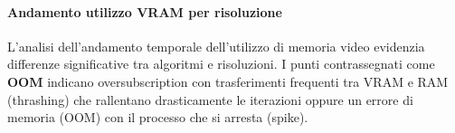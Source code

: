\paragraph{Andamento utilizzo VRAM per risoluzione}
L’analisi dell’andamento temporale dell’utilizzo di memoria video evidenzia differenze significative tra algoritmi e risoluzioni.
I punti contrassegnati come \textbf{OOM} indicano oversubscription con trasferimenti frequenti tra VRAM e RAM (thrashing) che rallentano drasticamente le iterazioni oppure un errore di memoria (OOM) con il processo che si arresta (spike).




